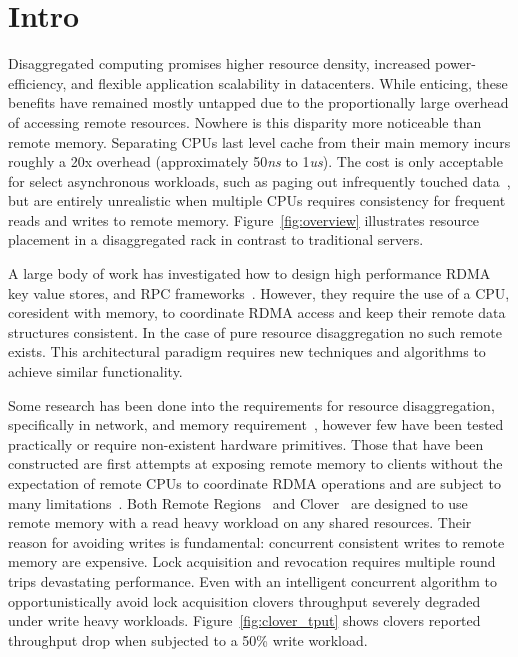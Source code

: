 \section{Intro}
\label{sec:intro}

Disaggregated computing promises higher resource density, increased
power-efficiency, and flexible application scalability in datacenters.
While enticing, these benefits have remained mostly untapped due to the proportionally large
overhead of accessing remote resources. Nowhere is this disparity more
noticeable than remote memory. Separating CPUs last level cache from
their main memory incurs roughly a 20x overhead (approximately
50\textit{ns} to 1\textit{us}).  The cost is only acceptable for
select asynchronous workloads, such as paging out infrequently touched
data~\cite{infiniswap,legoos,leap}, but are entirely unrealistic when multiple CPUs
requires consistency for frequent reads and writes to remote memory.
Figure~\ref{fig:overview} illustrates resource placement in a
disaggregated rack in contrast to traditional servers.

A large body of work has investigated how to design high performance
RDMA key value stores, and RPC
frameworks~\cite{cell,sonuma,storm,farm,herd,erpc}. However, they
require the use of a CPU, coresident with memory, to coordinate RDMA
access and keep their remote data structures consistent. In the case
of pure resource disaggregation no such remote exists. This
architectural paradigm requires new techniques and algorithms to achieve
similar functionality. 

Some research has been done into the requirements for resource
disaggregation, specifically in network, and memory
requirement~\cite{requirements, aguilera2019designing, disandapp,
amanda-hotnets}, however few have been tested practically or require
non-existent hardware primitives. Those that have been constructed are
first attempts at exposing remote memory to clients without the
expectation of remote CPUs to coordinate RDMA operations and are
subject to many limitations~\cite{reigons, clover}. Both Remote
Regions~\cite{reigons} and Clover~\cite{clover} are designed to use
remote memory with a read heavy workload on any shared resources.
Their reason for avoiding writes is fundamental: concurrent consistent
writes to remote memory are expensive. Lock acquisition and revocation
requires multiple round trips devastating performance. Even with an
intelligent concurrent algorithm to opportunistically avoid lock
acquisition clovers throughput severely degraded under write heavy
workloads. Figure~\ref{fig:clover_tput} shows clovers reported
throughput drop when subjected to a 50\% write workload.

